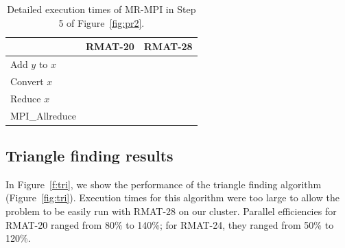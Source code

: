 \begin{table}[htb]
\begin{center}
\begin{tabular}{|l|r|r|}
\hline 
 & RMAT-20 & RMAT-28 \\
\hline
Add $y$ to $x$ & &  \\
Convert $x$ & &  \\
Reduce $x$ & & \\
MPI\_Allreduce & & \\
\hline
\end{tabular}
\caption{Detailed execution times of MR-MPI in Step 5 of 
Figure~\ref{fig:pr2}.}
\label{table:prdetial2}
\end{center}
\end{table}
%

\subsection{Triangle finding results}

In Figure~\ref{f:tri}, we show the performance of the triangle finding
algorithm (Figure~\ref{fig:tri}).  Execution times for this algorithm
were too large to allow the problem to be easily run with RMAT-28 on
our cluster.  Parallel efficiencies for RMAT-20 ranged from 80\% to
140\%; for RMAT-24, they ranged from 50\% to 120\%.


